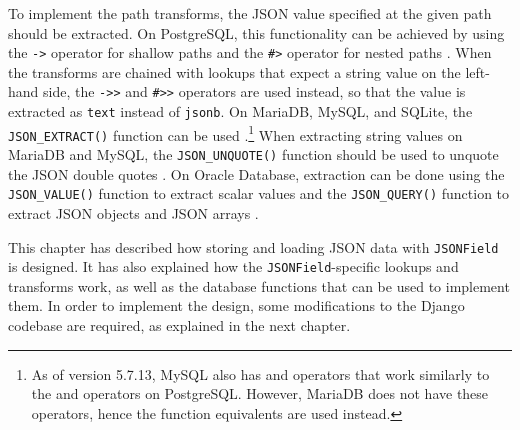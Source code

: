 To implement the path transforms, the JSON value specified at the given path
should be extracted. On PostgreSQL, this functionality can be achieved by using
the \verb|->| operator for shallow paths and the \verb|#>| operator for nested
paths \cite{postgres:json_operators}. When the transforms are chained with
lookups that expect a string value on the left-hand side, the \verb|->>| and
\verb|#>>| operators are used instead, so that the value is extracted as
\verb|text| instead of \verb|jsonb|. On MariaDB, MySQL, and SQLite, the
\verb|JSON_EXTRACT()| function can be used \cite{mariadb:json_extract,
mysql:json_search, sqlite:json1}.\footnote{As of version 5.7.13, MySQL also has
\code{->} and \code{->>} operators that work similarly to the \code{\#>} and
\code{\#>>} operators on PostgreSQL. However, MariaDB does not have these
operators, hence the function equivalents are used instead.} When extracting
string values on MariaDB and MySQL, the \verb|JSON_UNQUOTE()| function should be
used to unquote the JSON double quotes \cite{mariadb:json_unquote,
mysql:json_modify}. On Oracle Database, extraction can be done using the
\verb|JSON_VALUE()| function to extract scalar values and the
\verb|JSON_QUERY()| function to extract JSON objects and JSON arrays
\cite{oracle:json_value, oracle:json_query}.

This chapter has described how storing and loading JSON data with
\verb|JSONField| is designed. It has also explained how the
\verb|JSONField|-specific lookups and transforms work, as well as the database
functions that can be used to implement them. In order to implement the design,
some modifications to the Django codebase are required, as explained in the
next chapter.
